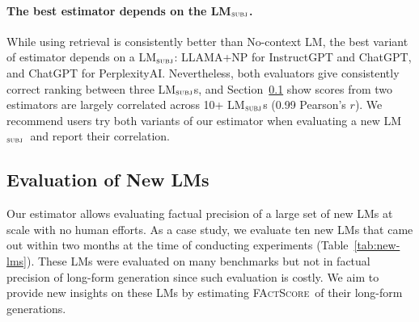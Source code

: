 \documentclass[11pt]{article}
\newcommand{\ours}{\textsc{FActScore}}
\newcommand{\subjectLM}{LM$_\textsc{subj}$}
\begin{document}
\vspace{-.3em}
\paragraph{The best estimator depends on the \subjectLM.}
While using retrieval is consistently better than No-context LM, the best variant of estimator depends on a \subjectLM: LLAMA+NP for InstructGPT and ChatGPT, and ChatGPT for PerplexityAI. 
%
Nevertheless, both evaluators give consistently correct ranking between three \subjectLM{}s, and Section~\ref{sec:eval-new-lms} show scores from two estimators are largely correlated across 10+ \subjectLM{}s (0.99 Pearson's $r$). We recommend users try both variants of our estimator when evaluating a new \subjectLM\ and report their correlation. %









\subsection{Evaluation of New LMs}\label{sec:eval-new-lms}
Our estimator allows evaluating factual precision of a large set of new LMs at scale with no human efforts.
As a case study, we evaluate ten new LMs that came out within two months at the time of conducting experiments (Table~\ref{tab:new-lms}).
These LMs were evaluated on many benchmarks but not in factual precision of long-form generation since such evaluation is costly.
We aim to provide new insights on these LMs by estimating \ours\ of their long-form generations.
\end{document}
